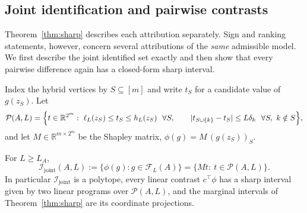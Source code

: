
\subsection{Joint identification and pairwise contrasts}\label{sec:joint}

Theorem~\ref{thm:sharp} describes each attribution separately. Sign and ranking statements, however, concern several
attributions of the \emph{same} admissible model. We first describe the joint identified set exactly and then show
that every pairwise difference again has a closed-form sharp interval.

Index the hybrid vertices by $S\subseteq[m]$ and write $t_S$ for a candidate value of $g(z_S)$. Let
\begin{equation}\label{eq:polytope}
\mathcal P(A,L)=\Bigl\{t\in\mathbb R^{2^m}:\ \ell_L(z_S)\le t_S\le h_L(z_S)\ \ \forall S,\qquad
|t_{S\cup\{k\}}-t_S|\le L\delta_k\ \ \forall S,\ k\notin S\Bigr\},
\end{equation}
and let $M\in\mathbb R^{m\times 2^m}$ be the Shapley matrix, $\phi(g)=M\,(g(z_S))_S$.

\begin{proposition}\label{prop:joint}
For $L\ge L_A$,
\[
\mathcal I_{\mathrm{joint}}(A,L):=\{\phi(g):g\in\mathcal F_L(A)\}=\{Mt:\ t\in\mathcal P(A,L)\}.
\]
In particular $\mathcal I_{\mathrm{joint}}$ is a polytope, every linear contrast $c^\top\phi$ has a sharp interval
given by two linear programs over $\mathcal P(A,L)$, and the marginal intervals of Theorem~\ref{thm:sharp} are its
coordinate projections.
\end{proposition}

